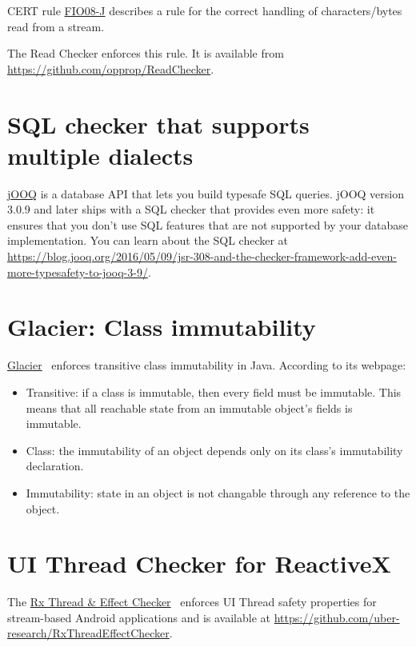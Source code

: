 CERT
rule \href{https://www.securecoding.cert.org/confluence/display/java/FIO08-J.+Distinguish+between+characters+or+bytes+read+from+a+stream+and+-1}{FIO08-J}
describes a rule for the correct handling of characters/bytes read
from a stream.

The Read Checker enforces this rule.
It is available from
\url{https://github.com/opprop/ReadChecker}.


\section{SQL checker that supports multiple dialects\label{sql-schecker}}

\href{http://www.jooq.org/}{jOOQ} is a database API that lets you build
typesafe SQL queries.  jOOQ version 3.0.9 and later ships with a SQL
checker that provides even more safety:  it ensures that you don't
use SQL features that are not supported by your database
implementation.  You can learn about the SQL checker at
\url{https://blog.jooq.org/2016/05/09/jsr-308-and-the-checker-framework-add-even-more-typesafety-to-jooq-3-9/}.


\section{Glacier:  Class immutability\label{glacier-immutability-checker}}

\href{http://mcoblenz.github.io/Glacier/}{Glacier}~\cite{CoblenzNAMS2017}
enforces transitive class immutability in Java.  According to its webpage:

\begin{itemize}
\item
  Transitive: if a class is immutable, then every field must be
  immutable. This means that all reachable state from an immutable object's
  fields is immutable.
\item
  Class: the immutability of an object depends only on its class's
  immutability declaration.
\item
  Immutability: state in an object is not changable through any reference to
  the object.
\end{itemize}

\section{UI Thread Checker for ReactiveX\label{rx-thread-checker}}
The \href{https://plv.colorado.edu/benno/ase18.pdf}{Rx Thread \& Effect Checker}~\cite{SteinCSC2018} enforces
UI Thread safety properties for stream-based Android applications and is available at
\url{https://github.com/uber-research/RxThreadEffectChecker}.

